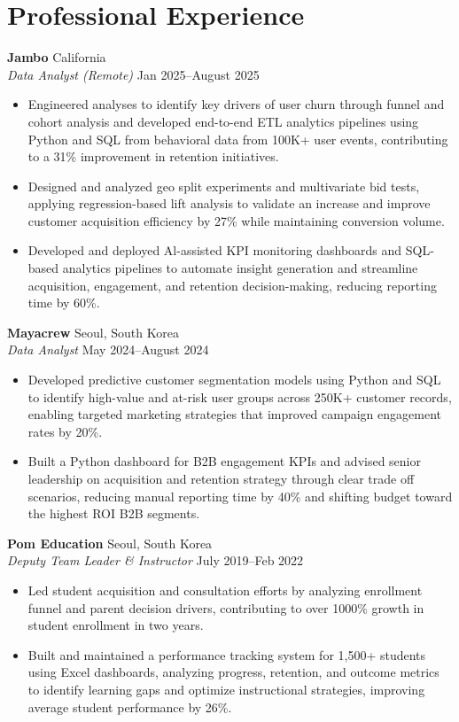\documentclass[11pt,a4paper]{article}
\begin{document}
\section*{Professional Experience}  
\noindent
\textbf{Jambo} \hfill California   \\
\textit{Data Analyst (Remote)} \hfill Jan 2025--August 2025  
\begin{itemize}[leftmargin=*, noitemsep, topsep=0pt]
    \item Engineered analyses to identify key drivers of user churn through funnel and cohort analysis and developed end-to-end ETL analytics pipelines using Python and SQL from behavioral data from 100K+ user events, contributing to a 31\% improvement in retention initiatives.  
    \item Designed and analyzed geo split experiments and multivariate bid tests, applying regression-based lift analysis to validate an increase and improve customer acquisition efficiency by 27\% while maintaining conversion volume.  
    \item Developed and deployed Al-assisted KPI monitoring dashboards and SQL-based analytics pipelines to automate insight generation and streamline acquisition, engagement, and retention decision-making, reducing reporting time by 60\%.  
\end{itemize}
\vspace{6pt}

\noindent
\textbf{Mayacrew} \hfill Seoul, South Korea   \\
\textit{Data Analyst} \hfill May 2024--August 2024  
\begin{itemize}[leftmargin=*, noitemsep, topsep=0pt]
    \item Developed predictive customer segmentation models using Python and SQL to identify high-value and at-risk user groups across 250K+ customer records, enabling targeted marketing strategies that improved campaign engagement rates by 20\%.  
    \item Built a Python dashboard for B2B engagement KPIs and advised senior leadership on acquisition and retention strategy through clear trade off scenarios, reducing manual reporting time by 40\% and shifting budget toward the highest ROI B2B segments.  
\end{itemize}
\vspace{6pt}

\noindent
\textbf{Pom Education} \hfill Seoul, South Korea   \\
\textit{Deputy Team Leader \& Instructor} \hfill July 2019--Feb 2022  
\begin{itemize}[leftmargin=*, noitemsep, topsep=0pt]
    \item Led student acquisition and consultation efforts by analyzing enrollment funnel and parent decision drivers, contributing to over 1000\% growth in student enrollment in two years.  
    \item Built and maintained a performance tracking system for 1,500+ students using Excel dashboards, analyzing progress, retention, and outcome metrics to identify learning gaps and optimize instructional strategies, improving average student performance by 26\%.  
\end{itemize}
\end{document}
